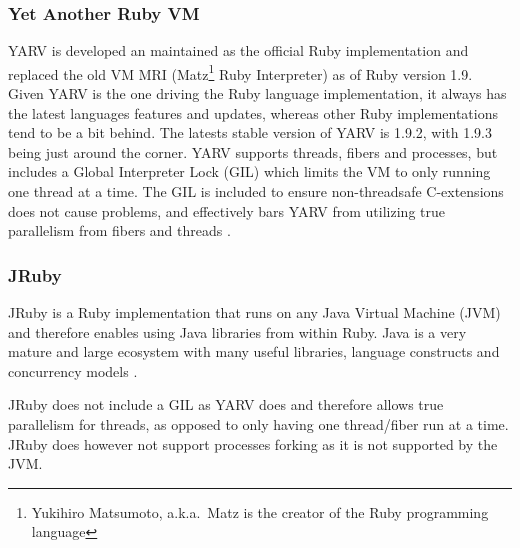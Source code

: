 \subsubsection{Yet Another Ruby VM}
YARV is developed an maintained as the official Ruby implementation and replaced
the old VM MRI (Matz\footnote{Yukihiro Matsumoto, a.k.a.\ Matz is the creator of 
the Ruby programming language} Ruby Interpreter) as of Ruby version 1.9. Given
YARV is the one driving the Ruby language implementation, it always has the
latest languages features and updates, whereas other Ruby implementations tend
to be a bit behind. The latests stable version of YARV is 1.9.2, with 1.9.3
being just around the corner. YARV supports threads, fibers and processes, but
includes a Global Interpreter Lock (GIL) which limits the VM to only running
one thread at a time. The GIL is included to ensure non-threadsafe
C-extensions does not cause problems, and effectively bars YARV from
utilizing true parallelism from fibers and threads \cite{ruby19}.

\subsubsection{JRuby}
JRuby is a Ruby implementation that runs on any Java Virtual Machine (JVM)
and therefore enables using Java libraries from within Ruby. Java is a very
mature and large ecosystem with many useful libraries, language constructs and
concurrency models \cite{usejruby}.

JRuby does not include a GIL as YARV does and therefore allows true
parallelism for threads, as opposed to only having one thread/fiber run
at a time. JRuby does however not support processes forking as it is not
supported by the JVM\@ \cite{jruby}.
